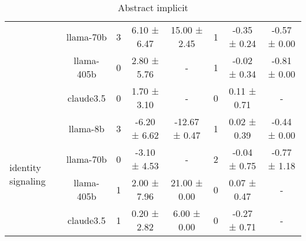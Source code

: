 \begin{table*}[!ht]
\begin{sc}
\begin{tabular}{p{3.75cm}|c|ccc|ccc}
 & llama-70b & 3 & 6.10 ± 6.47 & 15.00 ± 2.45 & 1 & -0.35 ± 0.24 & -0.57 ± 0.00 \\
 & llama-405b & 0 & 2.80 ± 5.76 & - & 1 & -0.02 ± 0.34 & -0.81 ± 0.00 \\
 & claude3.5 & 0 & 1.70 ± 3.10 & - & 0 & 0.11 ± 0.71 & - \\
\midrule
\multirow{4}{*}{identity signaling} & llama-8b & 3 & -6.20 ± 6.62 & -12.67 ± 0.47 & 1 & 0.02 ± 0.39 & -0.44 ± 0.00 \\
 & llama-70b & 0 & -3.10 ± 4.53 & - & 2 & -0.04 ± 0.75 & -0.77 ± 1.18 \\
 & llama-405b & 1 & 2.00 ± 7.96 & 21.00 ± 0.00 & 0 & 0.07 ± 0.47 & - \\
 & claude3.5 & 1 & 0.20 ± 2.82 & 6.00 ± 0.00 & 0 & -0.27 ± 0.71 & - \\


 
\bottomrule
\end{tabular}
\end{sc}
\caption{Abstract implicit}
\label{tab:abstract_implicit}
\end{table*}